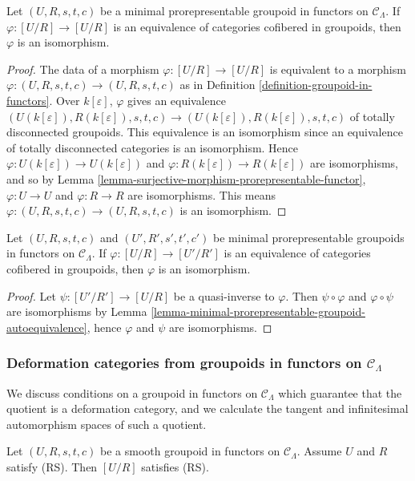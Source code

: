 \begin{lemma}
\label{lemma-minimal-prorepresentable-groupoid-autoequivalence}
Let $(U,R,s,t,c)$ be a minimal prorepresentable groupoid in functors on 
$\mathcal C_{\Lambda}$.  If $\varphi: [U/R] \rightarrow [U/R]$ is an 
equivalence of categories cofibered in groupoids, then $\varphi$ is an 
isomorphism.
\end{lemma}

\begin{proof}
The data of a morphism $\varphi: [U/R] \rightarrow [U/R]$ is equivalent to a 
morphism $\varphi: (U,R,s,t,c) \rightarrow (U,R,s,t,c)$ as in Definition 
\ref{definition-groupoid-in-functors}.  Over $k[\varepsilon]$, $\varphi$ gives 
an equivalence $(U(k[\varepsilon]),R(k[\varepsilon]), s,t,c) \rightarrow 
(U(k[\varepsilon]),R(k[\varepsilon]), s,t,c)$ of totally disconnected 
groupoids.  This equivalence is an isomorphism since an equivalence of totally 
disconnected categories is an isomorphism. Hence $\varphi: U(k[\varepsilon]) 
\rightarrow U(k[\varepsilon])$ and $\varphi: R(k[\varepsilon]) \rightarrow 
R(k[\varepsilon])$ are isomorphisms, and so by Lemma 
\ref{lemma-surjective-morphism-prorepresentable-functor}, $\varphi: U 
\rightarrow U$ and $\varphi: R \rightarrow R$ are isomorphisms.  This means 
$\varphi: (U,R,s,t,c) \rightarrow (U,R,s,t,c)$ is an isomorphism.
\end{proof}

\begin{lemma}
\label{lemma-minimal-prorepresentable-groupoid-equivalence}
Let $(U,R,s,t,c)$ and $(U',R',s',t',c')$ be minimal prorepresentable groupoids 
in functors on $\mathcal C_{\Lambda}$.  If $\varphi: [U/R] \rightarrow [U'/R']$ 
is an equivalence of categories cofibered in groupoids, then $\varphi$ is an 
isomorphism. 
\end{lemma}

\begin{proof}
Let $\psi: [U'/R'] \rightarrow [U/R]$ be a quasi-inverse to $\varphi$.  Then 
$\psi \circ \varphi$ and $\varphi \circ \psi$ are isomorphisms by Lemma 
\ref{lemma-minimal-prorepresentable-groupoid-autoequivalence}, hence $\varphi$ 
and $\psi$ are isomorphisms.
\end{proof}

\subsubsection{Deformation categories from groupoids in functors on $\mathcal 
C_{\Lambda}$}
We discuss conditions on a groupoid in functors on $\mathcal C_{\Lambda}$ which 
guarantee that the quotient is a deformation category, and we calculate the 
tangent and infinitesimal automorphism spaces of such a quotient.
\begin{lemma}
\label{lemma-smooth-RS-groupoid-in-functors-quotient}
Let $(U, R, s,t,c)$ be a smooth groupoid in functors on $\mathcal C_{\Lambda}$. 
Assume $U$ and $R$ satisfy \textnormal{(RS)}. Then $[U/R]$ satisfies 
\textnormal{(RS)}.
\end{lemma}

